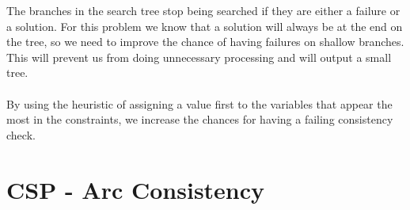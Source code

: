 \documentclass{article}
\def\ans#1{{\color{ans}#1}}
\begin{document}
\begin{enumerate}[label=(\alph*)]
    \ans{
        The branches in the search tree stop being searched if they are either a failure or a solution. For this 
        problem we know that a solution will always be at the end on the tree, so we need to improve the 
        chance of having failures on shallow branches. This will prevent us from doing unnecessary processing 
        and will output a small tree. \\ \\
        By using the heuristic of assigning a value first to the variables that appear the most in 
        the constraints, we increase the chances for having a failing consistency check.
    }
\end{enumerate}

\clearpage
\section{CSP - Arc Consistency}
\end{document}
